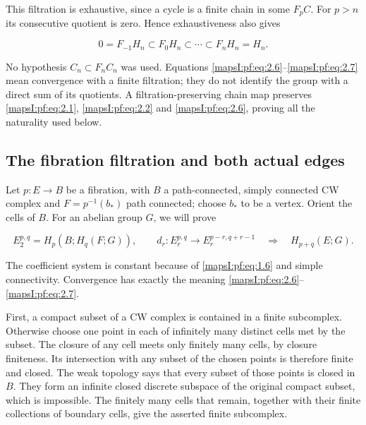 \documentclass[11pt]{article}
\begin{document}
This filtration is exhaustive, since a cycle is a finite chain in some \(F_pC\). For \(p>n\) its consecutive quotient is zero. Hence exhaustiveness also gives

\begin{equation}
0=F_{-1}H_n\subset F_0H_n\subset\cdots\subset F_nH_n=H_n.
\label{mapsI:pf:eq:2.7}
\end{equation}

No hypothesis \(C_n\subset F_nC_n\) was used. Equations \eqref{mapsI:pf:eq:2.6}--\eqref{mapsI:pf:eq:2.7} mean convergence with a finite filtration; they do not identify the group with a direct sum of its quotients. A filtration-preserving chain map preserves \eqref{mapsI:pf:eq:2.1}, \eqref{mapsI:pf:eq:2.2} and \eqref{mapsI:pf:eq:2.6}, proving all the naturality used below.

\subsection{The fibration filtration and both actual edges}
\label{mapsI:pf:serre-homology}

Let \(p:E\to B\) be a fibration, with \(B\) a path-connected, simply connected CW complex and \(F=p^{-1}(b_*)\) path connected; choose \(b_*\) to be a vertex. Orient the cells of \(B\). For an abelian group \(G\), we will prove

\begin{equation}
E_2^{p,q}=H_p(B;H_q(F;G)),\qquad
d_r:E_r^{p,q}\longrightarrow E_r^{p-r,q+r-1}
\quad\Longrightarrow\quad H_{p+q}(E;G).
\label{mapsI:pf:eq:3.1}
\end{equation}

The coefficient system is constant because of \eqref{mapsI:pf:eq:1.6} and simple connectivity. Convergence has exactly the meaning \eqref{mapsI:pf:eq:2.6}--\eqref{mapsI:pf:eq:2.7}.

First, a compact subset of a CW complex is contained in a finite subcomplex. Otherwise choose one point in each of infinitely many distinct cells met by the subset. The closure of any cell meets only finitely many cells, by closure finiteness. Its intersection with any subset of the chosen points is therefore finite and closed. The weak topology says that every subset of those points is closed in \(B\). They form an infinite closed discrete subspace of the original compact subset, which is impossible. The finitely many cells that remain, together with their finite collections of boundary cells, give the asserted finite subcomplex.
\end{document}
